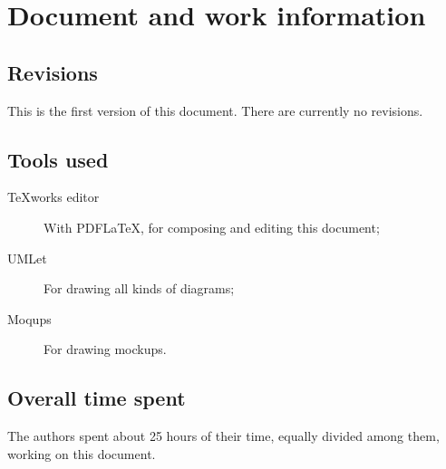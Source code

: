 \chapter{Document and work information}

\section{Revisions}
This is the first version of this document. There are currently no revisions.

\section{Tools used}
\begin{description}
\item[TeXworks editor] With PDF\LaTeX{}, for composing and editing this document;
\item[UMLet] For drawing all kinds of diagrams;
\item[Moqups] For drawing mockups.
\end{description}

\section{Overall time spent}
The authors spent about 25 hours of their time, equally divided among them, working on this document.
